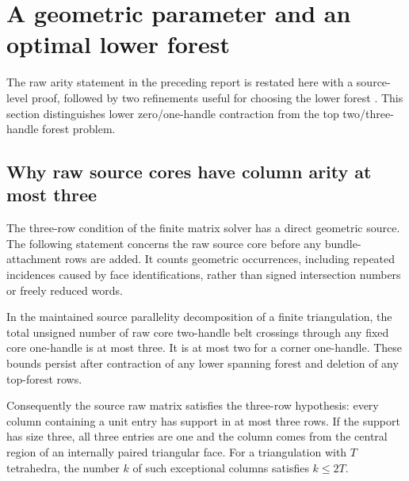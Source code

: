 \section{A geometric parameter and an optimal lower forest}
The raw arity statement in the preceding report is restated here with a
source-level proof, followed by two refinements useful for choosing the
lower forest \cite{IncomingForests2026}.  This section distinguishes lower
zero/one-handle contraction from the top two/three-handle forest problem.

\subsection{Why raw source cores have column arity at most three}
\label{sec:raw-core-arity}

The three-row condition of the finite matrix solver has a direct geometric
source.  The following statement concerns the raw source core before any
bundle-attachment rows are added.  It counts geometric occurrences, including
repeated incidences caused by face identifications, rather than signed
intersection numbers or freely reduced words.

\begin{proposition}
\label{prop:triangular-face-arity}
In the maintained source parallelity decomposition of a finite triangulation,
the total unsigned number of raw core two-handle belt crossings through any
fixed core one-handle is at most three.  It is at most two for a corner
one-handle.  These bounds persist after contraction of any lower spanning
forest and deletion of any top-forest rows.

Consequently the source raw matrix satisfies the three-row hypothesis:
every column containing a unit entry has support in at most three rows.
If the support has size three, all three entries are one and the column
comes from the central region of an internally paired triangular face.
For a triangulation with $T$ tetrahedra, the number $k$ of such exceptional
columns satisfies $k\le 2T$.
\end{proposition}

